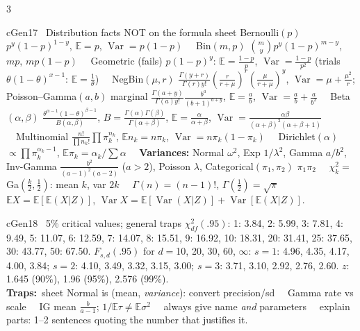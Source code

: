 \documentclass{article}
\newcommand{\trap}{{\color{cBay}\textbf{Traps:}}\ }
\newcommand{\E}{\mathbb E}
\newcommand{\V}{\operatorname{Var}}
\newcommand{\sep}{\ \textbullet\ }
\begin{document}
\begin{multicols*}{3}
\begin{tb}{cGen}{17 \textbullet\ Distribution facts NOT on the formula sheet}
Bernoulli$(p)$ $p^y(1-p)^{1-y}$, $\E=p$, $\V=p(1-p)$ \sep Bin$(m,p)$ $\binom my p^y(1-p)^{m-y}$, $mp$, $mp(1-p)$ \sep Geometric (fails) $p(1-p)^y$: $\E=\frac{1-p}p$, $\V=\frac{1-p}{p^2}$ (trials $\theta(1-\theta)^{x-1}$: $\E=\frac1\theta$) \sep NegBin$(\mu,r)$ $\frac{\Gamma(y+r)}{\Gamma(r)y!}(\frac r{r+\mu})^r(\frac\mu{r+\mu})^y$, $\V=\mu+\frac{\mu^2}r$; Poisson--Gamma$(a,b)$ marginal $\frac{\Gamma(a+y)}{\Gamma(a)y!}\frac{b^a}{(b+1)^{a+y}}$, $\E=\frac ab$, $\V=\frac ab+\frac a{b^2}$ \sep Beta$(\alpha,\beta)$ $\frac{\theta^{\alpha-1}(1-\theta)^{\beta-1}}{B(\alpha,\beta)}$, $B=\frac{\Gamma(\alpha)\Gamma(\beta)}{\Gamma(\alpha+\beta)}$, $\E=\frac\alpha{\alpha+\beta}$, $\V=\frac{\alpha\beta}{(\alpha+\beta)^2(\alpha+\beta+1)}$ \sep Multinomial $\frac{n!}{\prod n_k!}\prod\pi_k^{n_k}$, $\E n_k=n\pi_k$, $\V=n\pi_k(1-\pi_k)$ \sep Dirichlet$(\alpha)$ $\propto\prod\pi_k^{\alpha_k-1}$, $\E\pi_k=\alpha_k/\sum\alpha$ \sep \textbf{Variances:} Normal $\omega^2$, Exp $1/\lambda^2$, Gamma $a/b^2$, Inv-Gamma $\frac{b^2}{(a-1)^2(a-2)}$ ($a>2$), Poisson $\lambda$, Categorical$(\pi_1,\pi_2)$ $\pi_1\pi_2$ \sep $\chi^2_k=$Ga$(\frac k2,\frac12)$: mean $k$, var $2k$ \sep $\Gamma(n)=(n-1)!$, $\Gamma(\frac12)=\sqrt\pi$ \sep $\E X=\E[\E(X|Z)]$, $\V X=\E[\V(X|Z)]+\V[\E(X|Z)]$.
\end{tb}

\begin{tb}{cGen}{18 \textbullet\ 5\% critical values; general traps}
$\chi^2_{df}(.95)$: 1: 3.84, 2: 5.99, 3: 7.81, 4: 9.49, 5: 11.07, 6: 12.59, 7: 14.07, 8: 15.51, 9: 16.92, 10: 18.31, 20: 31.41, 25: 37.65, 30: 43.77, 50: 67.50.
$F_{s,d}(.95)$ for $d=$10, 20, 30, 60, $\infty$: $s{=}1$: 4.96, 4.35, 4.17, 4.00, 3.84; $s{=}2$: 4.10, 3.49, 3.32, 3.15, 3.00; $s{=}3$: 3.71, 3.10, 2.92, 2.76, 2.60. $z$: 1.645 (90\%), 1.96 (95\%), 2.576 (99\%).\\
\trap sheet Normal is (mean, \emph{variance}): convert precision/sd \sep Gamma rate vs scale \sep IG mean $\frac b{a-1}$; $1/\E\tau\ne\E\sigma^2$ \sep always give name \emph{and} parameters \sep explain parts: 1--2 sentences quoting the number that justifies it.
\end{tb}




\end{multicols*}
\end{document}
